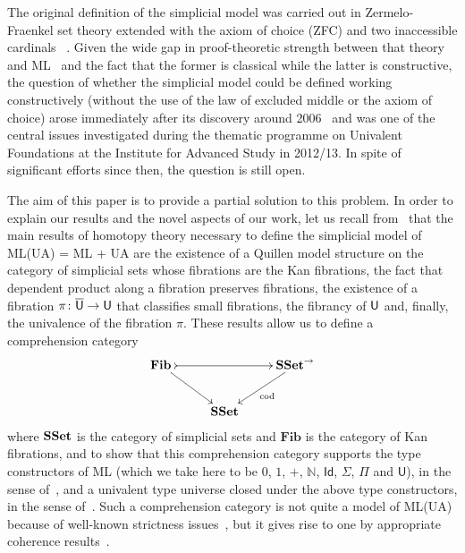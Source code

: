 \documentclass[reqno,10pt,a4paper,oneside,draft]{amsart}
\begin{document}
The original definition of the simplicial model  was carried out in  Zermelo-Fraenkel set theory extended with the axiom of choice (ZFC) and two inaccessible cardinals~\cite[Theorem~3.4.3]{voevodsky-simplicial-model} . Given the wide gap in proof-theoretic strength between that theory and ML~\cite{GrifforE:strsml} and the fact that the former is classical  while the latter is constructive,  the question of whether the simplicial model could be defined working constructively (\ie without the use of the law of excluded middle or the axiom of choice) arose immediately after its discovery around 2006~\cite{KapulkinC:uniss,StreicherT:modtts,VoevodskyV:notts} and was one of the central issues investigated during the thematic programme on Univalent Foundations at the Institute for Advanced Study in 2012/13. In spite of  significant efforts since then, the question is still open.

The aim of this paper is to provide a partial solution to this problem.  In order to
explain our results and the novel aspects of our work, let us recall from~\cite{voevodsky-simplicial-model} that the main results of  homotopy theory necessary 
to define the simplicial model of ML(UA) = ML + UA are 
the existence of a Quillen
model structure on the category of simplicial sets whose fibrations are the Kan fibrations, 
 the fact that dependent product along a fibration preserves fibrations,
 the existence of a fibration $\pi \colon \overline{\mathsf{U}} \to \mathsf{U}$ that classifies small fibrations, 
the fibrancy of $\mathsf{U}$ and, finally, the univalence of the fibration $\pi$. These results
allow us to define a comprehension category 
\[
\begin{gathered}
\xymatrix{
\mathbf{Fib}\,  \ar[dr] \ar@{>->}[rr] & & \SSet^{\to} \ar[dl]^{\mathrm{cod}} \\ 
 & \SSet &  }
 \end{gathered}
\]
where $\mathbf{SSet}$ is the category of simplicial sets 
and $\mathbf{Fib}$ is the category of Kan fibrations, 
and to show that this comprehension category supports the type
constructors of ML (which we take here to be $0$, $1$, $+$, $\mathbb{N}$, 
$\mathsf{Id}$, $\Sigma$, $\Pi$ and $\mathsf{U}$),
in the sense of~\cite{LumsdaineP:locuoc},  and a univalent type universe closed under the above type
constructors,  in the sense of~\cite{ShulmanM:allths}. Such a comprehension category is not quite a 
model of ML(UA) because of well-known strictness issues~\cite{HofmannM:intttl}, but it gives rise to one
by appropriate coherence results~\cite{clairambaultdybjer2014,HofmannM:intttl,voevodsky-simplicial-model,LumsdaineP:locuoc,ShulmanM:allths}.
\end{document}
